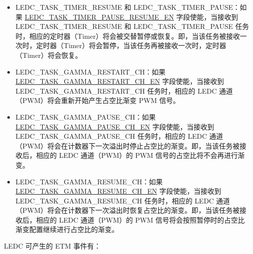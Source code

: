 \documentclass[main\_\_CN.tex]{subfiles}
\begin{document}
\begin{itemize}
\item LEDC\_TASK\_TIMER\_RESUME 和 LEDC\_TASK\_TIMER\_PAUSE：如果 \hyperref[fielddesc:LEDCTASKTIMERNPAUSERESUMEEN]{LEDC\_TASK\_TIMER\_PAUSE\_RESUME\_EN} 字段使能，当接收到 LEDC\_TASK\_TIMER\_RESUME 和 LEDC\_TASK\_TIMER\_PAUSE 任务时，相应的定时器（Timer）将会被交替暂停或恢复。即，当该任务被接收一次时，定时器（Timer）将会暂停，当该任务再被接收一次时，定时器（Timer）将会恢复。
\item LEDC\_TASK\_GAMMA\_RESTART\_CH：如果 \hyperref[fielddesc:LEDCTASKGAMMARESTARTCHNEN]{LEDC\_TASK\_GAMMA\_RESTART\_CH\_EN} 字段使能，当接收到 LEDC\_TASK\_GAMMA\_RESTART\_CH 任务时，相应的 LEDC 通道（PWM）将会重新开始产生占空比渐变 PWM 信号。
\item LEDC\_TASK\_GAMMA\_PAUSE\_CH：如果 \hyperref[fielddesc:LEDCTASKGAMMAPAUSECHNEN]{LEDC\_TASK\_GAMMA\_PAUSE\_CH\_EN} 字段使能，当接收到 LEDC\_TASK\_GAMMA\_PAUSE\_CH 任务时，相应的 LEDC 通道（PWM）将会在计数器下一次溢出时停止占空比的渐变。即，当该任务被接收后，相应的 LEDC 通道（PWM）的 PWM 信号的占空比将不会再进行渐变。
\item LEDC\_TASK\_GAMMA\_RESUME\_CH：如果 \hyperref[fielddesc:LEDCTASKGAMMARESUMECHNEN]{LEDC\_TASK\_GAMMA\_RESUME\_CH\_EN} 字段使能，当接收到 LEDC\_TASK\_GAMMA\_RESUME\_CH 任务时，相应的 LEDC 通道（PWM）将会在计数器下一次溢出时恢复占空比的渐变。即，当该任务被接收后，相应的 LEDC 通道（PWM）的 PWM 信号将会按照暂停时的占空比渐变配置继续进行占空比的渐变。
\end{itemize}

LEDC 可产生的 ETM 事件有：
\end{document}
